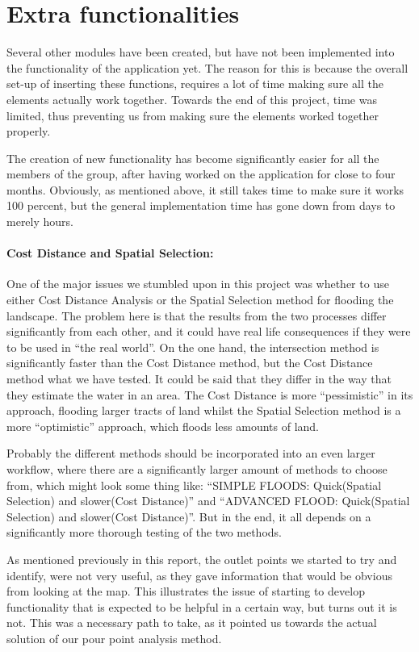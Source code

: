 \section{Extra functionalities}
Several other modules have been created, but have not been implemented into the functionality of the application yet. The reason for this is because the overall set-up of inserting these functions, requires a lot of time making sure all the elements actually work together. Towards the end of this project, time was limited, thus preventing us from making sure the elements worked together properly.  

The creation of new functionality has become significantly easier for all the members of the group, after having worked on the application for close to four months. Obviously, as mentioned above, it still takes time to make sure it works 100 percent, but the general implementation time has gone down from days to merely hours. 

\paragraph{Cost Distance and Spatial Selection:} One of the major issues we stumbled upon in this project was whether to use either Cost Distance Analysis or the Spatial Selection method for flooding the landscape. The problem here is that the results from the two processes differ significantly from each other, and it could have real life consequences if they were to be used in “the real world”. On the one hand, the intersection method is significantly faster than the Cost Distance method, but the Cost Distance method what we have tested. It could be said that they differ in the way that they estimate the water in an area. The Cost Distance is more “pessimistic” in its approach, flooding larger tracts of land whilst the Spatial Selection method is a more “optimistic” approach, which floods less amounts of land. 

Probably the different methods should be incorporated into an even larger workflow, where there are a significantly larger amount of methods to choose from, which might look some thing like: “SIMPLE FLOODS: Quick(Spatial Selection) and slower(Cost Distance)” and “ADVANCED FLOOD: Quick(Spatial Selection) and slower(Cost Distance)”. But in the end, it all depends on a significantly more thorough testing of the two methods.

As mentioned previously in this report, the outlet points we started to try and identify, were not very useful, as they gave information that would be obvious from looking at the map. This illustrates the issue of starting to develop functionality that is expected to be helpful in a certain way, but turns out it is not. This was a necessary path to take, as it pointed us towards the actual solution of our pour point analysis method. 

